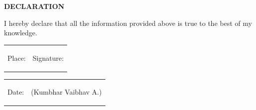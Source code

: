 \documentclass{article}
\begin{document}
\begin{framed}
	\large{\textbf{DECLARATION}}
\end{framed}
	\Large{I hereby declare that all the information provided above is true to the best of my knowledge. }


\vspace{3cm}
\begin{tabular}{cc}
\begin{minipage}{0.5\textwidth}
\begin{flushleft}Place:
\end{flushleft}
\end{minipage}
&
\begin{minipage}{0.5\textwidth}
\begin{center}Signature:
\end{center}
\end{minipage}
\end{tabular}


\begin{tabular}{cc}
\begin{minipage}{0.5\textwidth}
\begin{flushleft}Date:
\end{flushleft}
\end{minipage}
&
\begin{minipage}{0.5\textwidth}
\begin{center} (Kumbhar Vaibhav A.)
\end{center}
\end{minipage}
\end{tabular}
\end{document}
